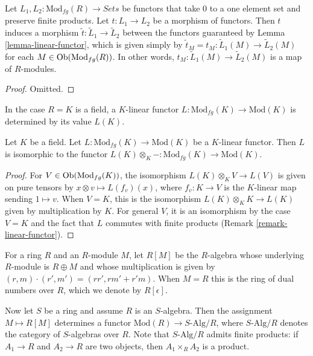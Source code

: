 \begin{lemma}
\label{lemma-morphism-linear-functors}
Let $L_1, L_2: \text{Mod}_{fg}(R) \to \textit{Sets}$ be
functors that take $0$ to a one element set and preserve finite products.
Let $t : L_1 \to L_2$ be a morphism of functors. Then $t$ induces a morphism
$\widetilde{t} : \widetilde{L}_1 \to \widetilde{L}_2$ between the
functors guaranteed by Lemma \ref{lemma-linear-functor}, which is given simply
by $\widetilde{t}_M = t_M: \widetilde{L}_1(M) \to \widetilde{L}_2(M)$
for each $M \in \mathop{\rm Ob}\nolimits(\text{Mod}_{fg}(R))$. In other words,
$t_M: \widetilde{L}_1(M) \to \widetilde{L}_2(M)$ is a map of $R$-modules.
\end{lemma}

\begin{proof}
Omitted.
\end{proof}

\noindent
In the case $R = K$ is a field, a $K$-linear functor
$L : \text{Mod}_{fg}(K) \to \text{Mod}(K)$ is determined by its value $L(K)$.

\begin{lemma}
\label{lemma-linear-functor-over-field}
Let $K$ be a field. Let $L: \text{Mod}_{fg}(K) \to
\text{Mod}(K)$ be a $K$-linear functor.  Then $L$ is isomorphic to the
functor $L(K) \otimes_K - : \text{Mod}_{fg}(K) \to
\text{Mod}(K)$.
\end{lemma}

\begin{proof}
For $V \in \mathop{\rm Ob}\nolimits(\text{Mod}_{fg}(K))$, the isomorphism
$L(K) \otimes_K V \to L(V)$ is given on pure tensors by
$x \otimes v \mapsto L(f_v)(x)$, where $f_v: K \to V$ is the $K$-linear map
sending $1 \mapsto v$.  When $V = K$, this is the isomorphism
$L(K) \otimes_K K \to L(K)$ given by multiplication by $K$.
For general $V$, it is an isomorphism by the case $V = K$ and the
fact that $L$ commutes with finite
products (Remark \ref{remark-linear-functor}).
\end{proof}

\noindent
For a ring $R$ and an $R$-module $M$, let $R[M]$ be the $R$-algebra whose
underlying $R$-module is $R \oplus M$ and whose multiplication is given by
$(r, m) \cdot (r', m') = (rr', rm' + r'm)$.  When $M = R$ this is the ring of
dual numbers over $R$, which we denote by $R[\epsilon]$.

\medskip \noindent
Now let $S$ be a ring and assume $R$ is an $S$-algebra.
Then the assignment $M \mapsto R[M]$ determines a functor
$\text{Mod}(R) \to S\text{-Alg}/R$, where $S\text{-Alg}/R$
denotes the category of $S$-algebras over $R$. Note that
$S\text{-Alg}/R$ admits finite products: if $A_1 \to R$ and
$A_2 \to R$ are two objects, then $A_1 \times_R A_2$ is a product.

